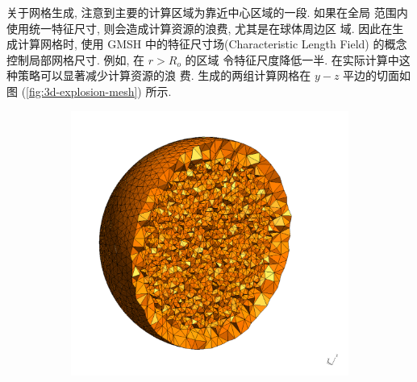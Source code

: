 关于网格生成, 注意到主要的计算区域为靠近中心区域的一段. 如果在全局
范围内使用统一特征尺寸, 则会造成计算资源的浪费, 尤其是在球体周边区
域. 因此在生成计算网格时, 使用 GMSH 中的特征尺寸场(Characteristic
Length Field) 的概念控制局部网格尺寸. 例如, 在 $r > R_{o}$ 的区域
令特征尺度降低一半. 在实际计算中这种策略可以显著减少计算资源的浪
费. 生成的两组计算网格在 $y-z$ 平边的切面如
图 (\ref{fig:3d-explosion-mesh}) 所示.
\begin{figure}[htbp]
  \centering
  \begin{subfigure}[b]{0.4\textwidth}
    \centering
    \includegraphics[scale=0.20]{./Pho/Chp4/3d_explosion_coarse_mesh.pdf}
  \end{subfigure}%
  ~
  \begin{subfigure}[b]{0.4\textwidth}
    \centering

\end{subfigure}
\end{figure}
